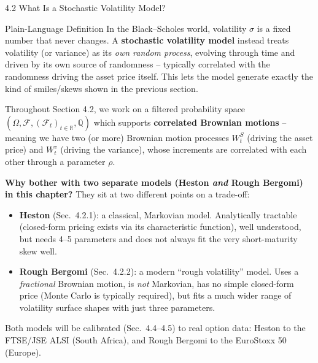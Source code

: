\documentclass[aspectratio=169,10pt]{beamer}
\begin{document}
\begin{frame}[allowframebreaks]{4.2 What Is a Stochastic Volatility Model?}

\begin{block}{Plain-Language Definition}
In the Black--Scholes world, volatility $\sigma$ is a fixed number that
never changes. A \textbf{stochastic volatility model} instead treats
volatility (or variance) as its \emph{own random process}, evolving through
time and driven by its own source of randomness -- typically correlated
with the randomness driving the asset price itself. This lets the model
generate exactly the kind of smiles/skews shown in the previous section.
\end{block}

Throughout Section 4.2, we work on a filtered probability space
$(\Omega, \mathcal{F}, (\mathcal{F}_t)_{t\in\mathbb{R}}, \mathbb{Q})$ which
supports \textbf{correlated Brownian motions} -- meaning we have two (or
more) Brownian motion processes $W_t^S$ (driving the asset price) and
$W_t^v$ (driving the variance), whose increments are correlated with each
other through a parameter $\rho$.

\framebreak

\textbf{Why bother with two separate models (Heston \emph{and} Rough
Bergomi) in this chapter?} They sit at two different points on a
trade-off:

\begin{itemize}
  \item \textbf{Heston} (Sec.\ 4.2.1): a classical, Markovian model.
        Analytically tractable (closed-form pricing exists via its
        characteristic function), well understood, but needs 4--5
        parameters and does not always fit the very short-maturity skew
        well.
  \item \textbf{Rough Bergomi} (Sec.\ 4.2.2): a modern ``rough
        volatility'' model. Uses a \emph{fractional} Brownian motion, is
        \emph{not} Markovian, has no simple closed-form price (Monte
        Carlo is typically required), but fits a much wider range of
        volatility surface shapes with just three parameters.
\end{itemize}

Both models will be calibrated (Sec.\ 4.4--4.5) to real option data: Heston
to the FTSE/JSE ALSI (South Africa), and Rough Bergomi to the EuroStoxx 50
(Europe).

\end{frame}

\end{document}

